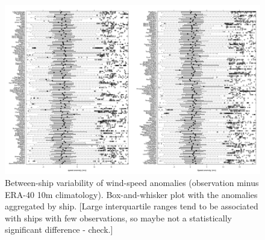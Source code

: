 \documentclass[a4paper,11pt]{article}
\begin{document}
\begin{figure}
\begin{center}
\includegraphics[angle=90, width=1.0\textwidth]{../anomaly_ts/ws_anom_bwplot_byShip}
\caption{Between-ship variability of wind-speed anomalies (observation minus ERA-40 10m climatology). Box-and-whisker plot with the anomalies aggregated by ship. [Large interquartile ranges tend to be associated with ships with few observations, so maybe not a statistically significant difference - check.]}
\label{ws_anom_bwplot_byShip}
\end{center}
\end{figure}
\end{document}
